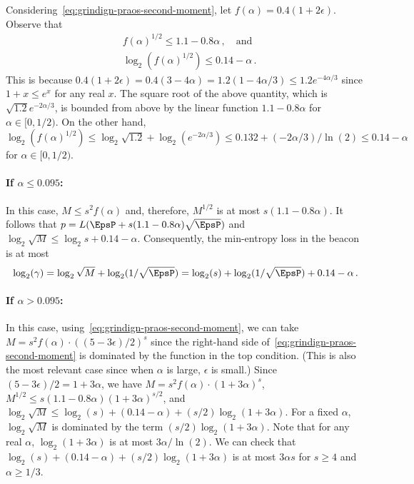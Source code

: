 Considering~\eqref{eq:grindign-praos-second-moment}, 
let $f(\alpha) = 0.4 (1 + 2\epsilon)$. 
Observe that 
\begin{align*}
  &f(\alpha)^{1/2} \leq 1.1 - 0.8 \alpha\,,
  \quad\text{and}\\
  &\log_2 (f(\alpha)^{1/2}) \leq 
  0.14 - \alpha
  \,.  
\end{align*}
This is because $0.4 (1+2\epsilon) 
= 0.4 (3 - 4\alpha) 
= 1.2 (1 - 4\alpha/3) 
\leq 1.2 e^{-4\alpha/3}$ 
since $1 + x \leq e^x$ for any real $x$. 
The square root of the above quantity, which is $\sqrt{1.2} e^{-2\alpha/3}$, 
is bounded from above by the linear function 
$1.1 - 0.8 \alpha$ for $\alpha \in [0,  1/2)$. 
On the other hand, 
$\log_2 (f(\alpha)^{1/2})
\leq \log_2 \sqrt{1.2} + \log_2(e^{-2\alpha/3})
\leq 0.132 + (-2\alpha/3)/\ln(2)
\leq  0.14 - \alpha
$
for $\alpha \in [0, 1/2)$. 

\paragraph{If $\alpha \leq 0.095$:} 
In this case, $M \leq s^2 f(\alpha)$ 
and, therefore, $M^{1/2}$ is at most $s (1.1 - 0.8 \alpha)$.
It follows that $p = L (\EpsP + s (1.1 - 0.8 \alpha) \sqrt{\EpsP})$
and 
$
\log_2 \sqrt{M}
\leq \log_2 s + 0.14 - \alpha
$.
Consequently, the min-entropy loss in the beacon is at most 
$$
  \log_2(\gamma) 
  = \log_2 \sqrt{M} + \log_2(1/\sqrt{\EpsP}) 
  = \log_2(s) + \log_2(1/\sqrt{\EpsP})  
    + 0.14 - \alpha
    \,.
$$




\paragraph{If $\alpha > 0.095$:} 
In this case, using~\eqref{eq:grindign-praos-second-moment}, 
we can take 
$M = s^2 f(\alpha) \cdot ((5 - 3\epsilon)/2)^s$ 
since 
the right-hand side of~\eqref{eq:grindign-praos-second-moment} is dominated by the function in the top condition. 
(This is also the most relevant case since 
when $\alpha$ is large, $\epsilon$ is small.)
Since 
$(5-3\epsilon)/2 = 1 + 3\alpha$, 
we have 
$M = s^2 f(\alpha) \cdot (1+3\alpha)^s$, 
$M^{1/2} \leq s (1.1 - 0.8 \alpha) (1+3\alpha)^{s/2}$, 
and $\log_2 \sqrt{M} \leq \log_2(s) + (0.14 - \alpha) + (s/2) \log_2(1+3\alpha)$. 
For a fixed $\alpha$, 
$\log_2 \sqrt{M}$ is dominated by the term $(s/2) \log_2(1+3\alpha)$. 
Note that for any real $\alpha$, $\log_2(1+3 \alpha)$ is at most $3\alpha/\ln(2)$.
We can check that $\log_2(s) + (0.14 - \alpha) + (s/2) \log_2(1+3\alpha)$ is at most $3 \alpha s$ for $s \geq 4$ and $\alpha \geq 1/3$.

